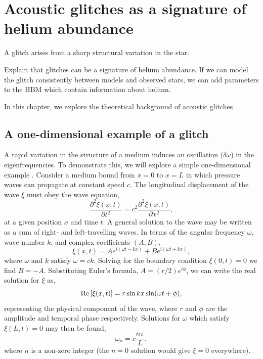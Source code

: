 %
%
%
%
%
\chapter[Acoustic glitches]{Acoustic glitches as a signature of helium abundance}\label{chap:glitch}

A glitch arises from a sharp structural variation in the star.

Explain that glitches can be a signature of helium abundance. If we can model the glitch consistently between models and observed stars, we can add parameters to the HBM which contain information about helium.

In this chapter, we explore the theoretical background of acoustic glitches

\section[1D example]{A one-dimensional example of a glitch}\label{sec:1d-glitch}

A rapid variation in the structure of a medium induces an oscillation (\(\delta\omega\)) in the eigenfrequencies. To demonstrate this, we will explore a simple one-dimensional example \citep[e.g][]{Verner2005}. Consider a medium bound from \(x=0\) to \(x=L\) in which pressure waves can propagate at constant speed \(c\). The longitudinal displacement of the wave \(\xi\) must obey the wave equation,
%
\begin{equation}
    \frac{\partial^2\xi(x, t)}{\partial t^2} = c^2 \frac{\partial^2\xi(x, t)}{\partial x^2},
\end{equation}
%
at a given position \(x\) and time \(t\). A general solution to the wave may be written as a sum of right- and left-travelling waves. In terms of the angular frequency \(\omega\), wave number \(k\), and complex coefficients \((A, B)\),
%
\begin{equation}
    \xi(x, t) = A e^{i (\omega t - k x)} + B e^{i (\omega t + k x)},
\end{equation}
%
where \(\omega\) and \(k\) satisfy \(\omega = c k\). Solving for the boundary condition \(\xi(0, t) = 0\) we find \(B = - A\). Substituting Euler's formula, \(A = (r/2) e^{i\phi}\), we can write the real solution for \(\xi\) as,
%
\begin{equation}
    {\mathrm{Re}}\left[\xi(x, t)\right] = r \sin k x \sin(\omega t + \phi),
\end{equation}
%
representing the physical component of the wave, where \(r\) and \(\phi\) are the amplitude and temporal phase respectively. Solutions for \(\omega\) which satisfy \(\xi(L, t)=0\) may then be found,
%
\begin{equation}
    \omega_n = c \frac{n \pi}{L}, \label{eq:omega-n}
\end{equation}
%
where \(n\) is a non-zero integer (the \(n=0\) solution would give \(\xi=0\) everywhere).

